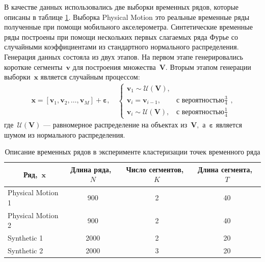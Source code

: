 В качестве данных использовались две выборки временных рядов, которые описаны в таблице \ref{table_1}. 
Выборка Physical Motion это реальные временные ряды полученные при помощи мобильного акселерометра. 
Синтетические временные ряды построены при помощи нескольких первых слагаемых ряда Фурье со случайными коэффициентами из стандартного нормального распределения. 
Генерация данных состояла из двух этапов. 
На первом этапе генерировались короткие сегменты~$\textbf{v}$ для построения множества~$\mathbf{V}$. 
Вторым этапом генерации выборки~$\textbf{x}$ является случайным процессом:
\[
\label{eq:exp:1}
\begin{aligned}
\textbf{x} = [\textbf{v}_{1}, \textbf{v}_{2}, \ldots, \textbf{v}_{M}] + \bm{\varepsilon}, \quad \begin{cases}
    \textbf{v}_{1} \sim \mathcal{U}\left(\mathbf{V}\right),\\
    \textbf{v}_{i} = \textbf{v}_{i - 1}, & \text{с вероятностью} \frac{3}{4}\\
    \textbf{v}_{i} \sim \mathcal{U}\left(\mathbf{V}\right), & \text{с вероятностью} \frac{1}{4}
\end{cases},
\end{aligned}
\]
где~$\mathcal{U}\left(\mathbf{V}\right)$ --- равномерное распределение на объектах из~$\mathbf{V},$ а~$\bm{\varepsilon}$ является шумом из нормального распределения.

\begin{table}[h!t]
\begin{center}
\caption{Описание временных рядов в эксперименте кластеризации точек временного ряда}
\label{table_1}
\begin{tabular}{|c|c|c|c|}
\hline
	Ряд,~$\textbf{x}$ &Длина ряда,~$N$& Число сегментов,~$K$&Длина сегмента,~$T$\\
	\hline
	\multicolumn{1}{|l|}{Physical Motion 1}
	& 900& 2& 40\\
	\hline
	\multicolumn{1}{|l|}{Physical Motion 2}
	& 900& 2& 40\\
	\hline
	\multicolumn{1}{|l|}{Synthetic 1}
	& 2000& 2& 20\\
	\hline
	\multicolumn{1}{|l|}{Synthetic 2}
	& 2000& 3& 20\\
\hline

\end{tabular}
\end{center}
\end{table}


